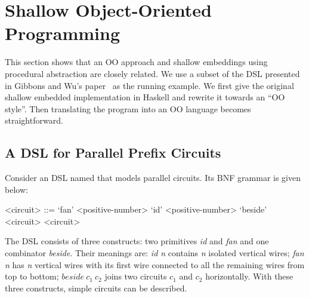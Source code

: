 \section{Shallow Object-Oriented Programming}\label{sec:oo}

\begin{comment}
Weixin writes this part.

Argue that shallow embeddings and straightforward OO 
programs are essentially the same thing. 

Start from a simple shallow DSL in Haskell, 
and iterate throught it until you reach a form 
that looks like an OO program.

Show how todo transformations in Shallow embeddings
using the insight of how to do transformations in OO
programs.

Show the correponding Java programs and the Java program 
with transformation that we can port back to Haskell.
\end{comment}

This section shows that an OO approach and shallow embeddings using
procedural abstraction are closely related.  We use a subset of the
DSL presented in Gibbons and Wu's paper~\cite{gibbons2014folding} as
the running example.  We first give the original shallow embedded
implementation in Haskell and rewrite it towards an ``OO style''.
Then translating the program into an OO language becomes straightforward.

\subsection{A DSL for Parallel Prefix Circuits}
Consider an DSL named \dsl that models parallel circuits.
Its BNF grammar is given below:
\setlength{\grammarindent}{5em} %

\begin{grammar}
<circuit> ::= `fan' <positive-number>
\alt `id' <positive-number>
\alt `beside' <circuit> <circuit>
\end{grammar}

\noindent The DSL consists of three constructs: two primitives
\emph{id} and \emph{fan} and one combinator \emph{beside}.
Their meanings are: \emph{id n} contains \emph{n} isolated vertical wires;
\emph{fan n} has \emph{n} vertical wires with its first wire connected to
all the remaining wires from top to bottom; $beside\ c_1\ c_2$ joins two circuits
$c_1$ and $c_2$ horizontally.
With these three constructs, simple circuits can be described.

